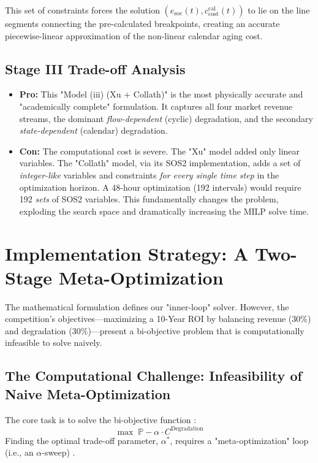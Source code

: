 \documentclass[11pt, a4paper]{article}
\begin{document}
This set of constraints forces the solution $(e_{\mathrm{soc}}(t), c^{\mathrm{cal}}_{\mathrm{cost}}(t))$ to lie on the line segments connecting the pre-calculated breakpoints, creating an accurate piecewise-linear approximation of the non-linear calendar aging cost.

\subsection{Stage III Trade-off Analysis}

\begin{itemize}
    \item \textbf{Pro:} This "Model (iii) (Xu + Collath)" is the most physically accurate and "academically complete" formulation. It captures all four market revenue streams, the dominant \textit{flow-dependent} (cyclic) degradation, and the secondary \textit{state-dependent} (calendar) degradation.
    \item \textbf{Con:} The computational cost is severe. The "Xu" model added only linear variables. The "Collath" model, via its SOS2 implementation, adds a set of \textit{integer-like} variables and constraints \textit{for every single time step} in the optimization horizon. A 48-hour optimization (192 intervals) would require 192 \textit{sets} of SOS2 variables. This fundamentally changes the problem, exploding the search space and dramatically increasing the MILP solve time.
\end{itemize}

\section{Implementation Strategy: A Two-Stage Meta-Optimization}
The mathematical formulation defines our "inner-loop" solver. However, the competition's objectives---maximizing a 10-Year ROI by balancing revenue (30\%) and degradation (30\%)---present a bi-objective problem that is computationally infeasible to solve naively.

\subsection{The Computational Challenge: Infeasibility of Naive Meta-Optimization}
The core task is to solve the bi-objective function \cite{huawei2025}:
$$ \max \; \mathbb{P} - \alpha \cdot C^{\mathrm{Degradation}} $$
Finding the optimal trade-off parameter, $\alpha^*$, requires a "meta-optimization" loop (i.e., an $\alpha$-sweep) \cite{828-834}.
\end{document}
